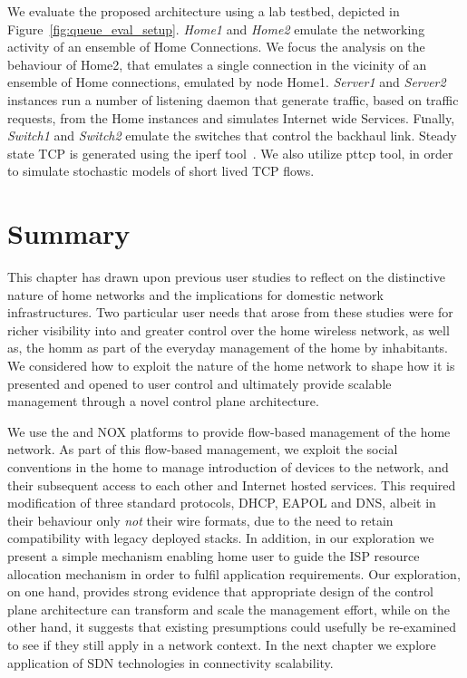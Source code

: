 We evaluate the proposed architecture using a lab testbed, depicted in
Figure~\ref{fig:queue_eval_setup}. {\it Home1} and {\it Home2} emulate the
networking activity of an ensemble of Home Connections. We focus the
analysis on the behaviour of Home2, that emulates a single connection in the
vicinity of an ensemble of Home connections, emulated by node Home1. 
{\it Server1} and {\it Server2} instances run a number of listening daemon that
generate traffic, based on traffic requests, from the Home instances and
simulates Internet wide Services. Fιnally, {\it Switch1} and {\it  Switch2}
emulate the switches that control the backhaul link. Steady state TCP is
generated using the iperf tool~\cite{iperf}. We also utilize pttcp tool, in
order to simulate stochastic models of short lived TCP flows. 


\section{Summary} \label{s:conclusion}

This chapter has drawn upon previous user studies to reflect on the distinctive
nature of home networks and the implications for domestic network
infrastructures.  Two particular user needs that arose from these studies were
for richer visibility into and greater control over the home wireless network, as
well as, the homm
as part of the everyday management of the home by inhabitants.  We  considered
how to exploit the nature of the home network to shape how it is presented and
opened to user control and ultimately provide scalable management through a
novel control plane architecture.  

We use the \ovs and NOX platforms to provide flow-based management of the home
network.  As part of this flow-based management, we exploit the social
conventions in the home to manage introduction of devices  to the network, and
their subsequent access to each other and Internet hosted services.  This
required modification of three standard protocols, DHCP, EAPOL and DNS, albeit
in their behaviour only \emph{not} their wire formats, due to the need to retain
compatibility with legacy deployed stacks. In addition, in our exploration we
present a simple mechanism enabling home user to guide the ISP resource
allocation mechanism in order to fulfil application requirements.  Our
exploration, on one hand, provides strong evidence that appropriate design of
the control plane architecture can transform and scale the management effort,
while on the other hand, it suggests that existing presumptions could usefully
be re-examined to see if they still apply in a network context.  In the next
chapter we explore application of SDN technologies in connectivity scalability. 

